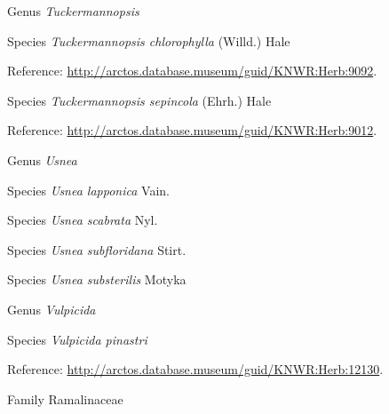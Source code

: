\documentclass[9pt, article]{memoir}
\begin{document}
\begin{multicols}{2}
\vspace{6pt}\noindent\hspace{30pt}Genus \textit{Tuckermannopsis}


\vspace{6pt}\noindent\hspace{36pt}Species \textit{Tuckermannopsis chlorophylla} (Willd.) Hale


\vspace{6pt}Reference: 
\url{http://arctos.database.museum/guid/KNWR:Herb:9092}.

\vspace{6pt}\noindent\hspace{36pt}Species \textit{Tuckermannopsis sepincola} (Ehrh.) Hale


\vspace{6pt}Reference: 
\url{http://arctos.database.museum/guid/KNWR:Herb:9012}.

\vspace{6pt}\noindent\hspace{30pt}Genus \textit{Usnea}


\vspace{6pt}\noindent\hspace{36pt}Species \textit{Usnea lapponica} Vain.


\vspace{6pt}\noindent\hspace{36pt}Species \textit{Usnea scabrata} Nyl.


\vspace{6pt}\noindent\hspace{36pt}Species \textit{Usnea subfloridana} Stirt.


\vspace{6pt}\noindent\hspace{36pt}Species \textit{Usnea substerilis} Motyka


\vspace{6pt}\noindent\hspace{30pt}Genus \textit{Vulpicida}


\vspace{6pt}\noindent\hspace{36pt}Species \textit{Vulpicida pinastri}


\vspace{6pt}Reference: 
\url{http://arctos.database.museum/guid/KNWR:Herb:12130}.

\vspace{6pt}\noindent\hspace{24pt}Family Ramalinaceae



\end{multicols}
\end{document}
